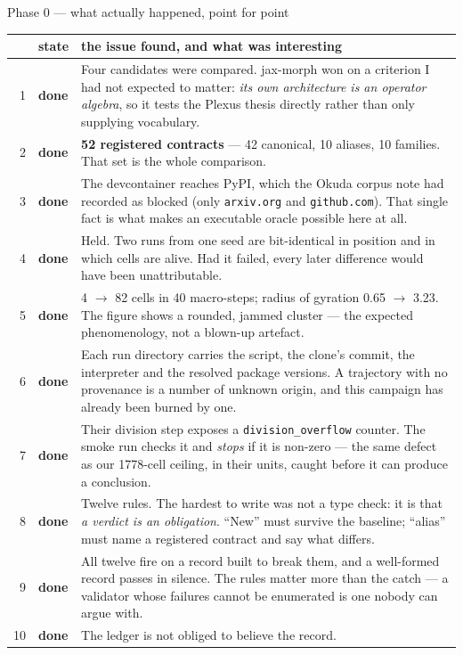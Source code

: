 \documentclass[11pt,a4paper]{article}
\newcommand{\code}[1]{\texttt{#1}}
\newcommand{\dn}{\textcolor{good}{\textbf{done}}}
\begin{document}
\begin{phasebox}{Phase 0 --- what actually happened, point for point}
\footnotesize
\begin{tabular}{@{}r@{.\ } l p{9.1cm}@{}}
\toprule
& \textbf{state} & \textbf{the issue found, and what was interesting}\\
\midrule
1 & \dn & Four candidates were compared. jax-morph won on a criterion I had not expected to
matter: \emph{its own architecture is an operator algebra}, so it tests the Plexus thesis directly
rather than only supplying vocabulary.\\
2 & \dn & \textbf{52 registered contracts} --- 42 canonical, 10 aliases, 10 families. That set is
the whole comparison.\\
3 & \dn & The devcontainer reaches PyPI, which the Okuda corpus note had recorded as blocked (only
\code{arxiv.org} and \code{github.com}). That single fact is what makes an executable oracle
possible here at all.\\
4 & \dn & Held. Two runs from one seed are bit-identical in position and in which cells are alive.
Had it failed, every later difference would have been unattributable.\\
5 & \dn & 4 $\to$ 82 cells in 40 macro-steps; radius of gyration 0.65 $\to$ 3.23. The figure shows
a rounded, jammed cluster --- the expected phenomenology, not a blown-up artefact.\\
6 & \dn & Each run directory carries the script, the clone's commit, the interpreter and the
resolved package versions. A trajectory with no provenance is a number of unknown origin, and this
campaign has already been burned by one.\\
7 & \dn & Their division step exposes a \code{division\_overflow} counter. The smoke run checks it
and \emph{stops} if it is non-zero --- the same defect as our 1778-cell ceiling, in their units,
caught before it can produce a conclusion.\\
8 & \dn & Twelve rules. The hardest to write was not a type check: it is that \emph{a verdict is
an obligation}. ``New'' must survive the baseline; ``alias'' must name a registered contract and
say what differs.\\
9 & \dn & All twelve fire on a record built to break them, and a well-formed record passes in
silence. The rules matter more than the catch --- a validator whose failures cannot be enumerated
is one nobody can argue with.\\
10 & \dn & The ledger is not obliged to believe the record.\\

\end{tabular}
\end{phasebox}
\end{document}
